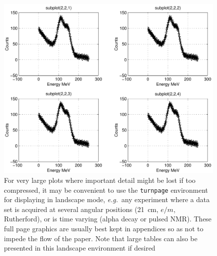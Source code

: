 \begin{turnpage}
\begin{figure}[htb]
\includegraphics[height=0.89\textwidth]{sample-fig3}
\caption{For very large plots where important detail might be lost
if too compressed, it may be convenient to use the \texttt{turnpage}
environment for displaying in landscape mode, \textit{e.g.}\ any experiment
where a data set is acquired at several angular positions (21~cm,
$e/m$, Rutherford), or is time varying (alpha decay or
pulsed NMR).  These full page graphics are usually best kept in
appendices so as not to impede the flow of the paper.  Note that
large tables can also be presented in this landscape environment if
desired \label{fig:landscapegraphic}}
\end{figure}
\end{turnpage}

